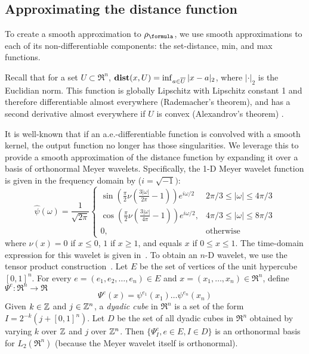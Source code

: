 \subsection{Approximating the distance function}
\label{sec:dist smoothing}
To create a smooth approximation to $\robf$, we use smooth approximations to each of its non-differentiable components: the set-distance, min, and max functions.

Recall that for a set $U \subset \Re^n$, $\mathbf{dist}(x,U) = \inf_{a \in \overline{U}} |x-a|_2$, where $|\cdot|_2$ is the Euclidian norm.
This function is globally Lipschitz with Lipschitz constant 1 and therefore differentiable almost everywhere (Rademacher's theorem), and has a second derivative almost everywhere if $U$ is convex (Alexandrov's theorem) \cite{MakelaN92book}.

It is well-known that if an a.e.-differentiable function is convolved with a smooth kernel, the output function no longer has those singularities.
We leverage this to provide a smooth approximation of the distance function by expanding it over a basis of orthonormal Meyer wavelets.
Specifically, the 1-D Meyer wavelet function is given in the frequency domain by ($i = \sqrt{-1})$:
\[\widehat{\psi}(\omega) = \frac{1}{\sqrt{2\pi}} \left \lbrace 
\begin{matrix} \sin (\frac{\pi}{2}\nu(\frac{3|\omega|}{2\pi}-1))e^{i\omega/2} & 2\pi/3 \leq |\omega| \leq 4\pi/3 \\
\cos (\frac{\pi}{2}\nu(\frac{3|\omega|}{4\pi}-1))e^{i\omega/2}, & 4\pi/3 \leq |\omega| \leq 8\pi/3\\
0, &\text{otherwise}\end{matrix} \right. \]
where $\nu(x) = 0$ if $x\leq 0$, $1$ if $x \geq 1$, and equals $x$ if $0\leq x \leq 1$.
The time-domain expression for this wavelet is given in~\cite{Valenzuela15}.
To obtain an $n$-D wavelet, we use the tensor product construction~\cite{MallatBook}.
Let $E$ be the set of vertices of the unit hypercube $[0,1]^n$.
For every $e = (e_1,e_2,\ldots,e_n) \in E$ and $x = (x_1,\ldots,x_n) \in \Re^n$, define $\Psi^e:\Re^n \rightarrow \Re$
\begin{equation*}
\label{eq:tensor meyer}
\Psi^e(x)= \psi^{e_1}(x_1)\ldots \psi^{e_n}(x_n)
\end{equation*}
Given $k \in \mathbb{Z}$ and $j \in \mathbb{Z}^n$, a \textit{dyadic cube} in $\Re^n$ is a set of the form $I = 2^{-k}(j + [0,1]^n)$.
Let $D$ be the set of all dyadic cubes in $\Re^n$ obtained by varying $k$ over $\mathbb{Z}$ and $j$ over $\mathbb{Z}^n$.
Then $\{\Psi^e_{I}, e \in E, I\in D\}$ is an orthonormal basis for $L_2(\Re^n)$ (because the Meyer wavelet itself is orthonormal).
